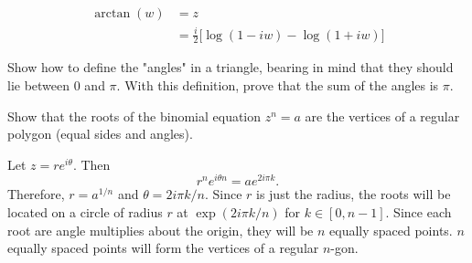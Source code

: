 \begin{exercise}
\begin{align*}
    \arctan(w) & = z\\
        & = \frac{i}{2}\bigl[\log(1 - iw) - \log(1 + iw)\bigr]
  \end{align*}
\item
  Show how to define the "angles" in a triangle, bearing in mind that they
  should lie between \(0\) and \(\pi\).
  With this definition, prove that the sum of the angles is \(\pi\).
\item
  Show that the roots of the binomial equation \(z^n = a\) are the vertices of
  a regular polygon (equal sides and angles).
  \par\smallskip
  Let \(z = re^{i\theta}\).
  Then
  \[
  r^ne^{i\theta n} = ae^{2i\pi k}.
  \]
  Therefore, \(r = a^{1/n}\) and \(\theta = 2i\pi k/n\).
  Since \(r\) is just the radius, the roots will be located on a circle of
  radius \(r\) at \(\exp(2i\pi k/n)\) for \(k\in[0,n-1]\).
  Since each root are angle multiplies about the origin, they will be \(n\)
  equally spaced points.
  \(n\) equally spaced points will form the vertices of a regular \(n\)-gon.
\end{exercise}

